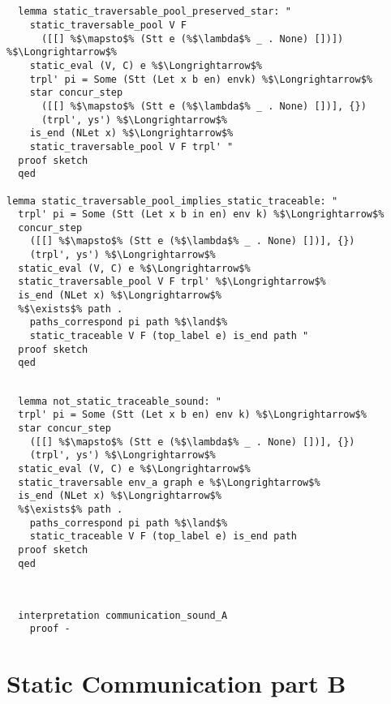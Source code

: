 \begin{lstlisting}[style=codestyle1, escapechar=\%]


  lemma static_traversable_pool_preserved_star: "
    static_traversable_pool V F
      ([[] %$\mapsto$% (Stt e (%$\lambda$% _ . None) [])]) %$\Longrightarrow$%
    static_eval (V, C) e %$\Longrightarrow$%
    trpl' pi = Some (Stt (Let x b en) envk) %$\Longrightarrow$%
    star concur_step
      ([[] %$\mapsto$% (Stt e (%$\lambda$% _ . None) [])], {})
      (trpl', ys') %$\Longrightarrow$%
    is_end (NLet x) %$\Longrightarrow$%
    static_traversable_pool V F trpl' "
  proof sketch
  qed

lemma static_traversable_pool_implies_static_traceable: "
  trpl' pi = Some (Stt (Let x b in en) env k) %$\Longrightarrow$%
  concur_step
    ([[] %$\mapsto$% (Stt e (%$\lambda$% _ . None) [])], {})
    (trpl', ys') %$\Longrightarrow$% 
  static_eval (V, C) e %$\Longrightarrow$%
  static_traversable_pool V F trpl' %$\Longrightarrow$%
  is_end (NLet x) %$\Longrightarrow$%
  %$\exists$% path . 
    paths_correspond pi path %$\land$%
    static_traceable V F (top_label e) is_end path "
  proof sketch
  qed
  \end{lstlisting}


\begin{lstlisting}[style=codestyle1, escapechar=\%]

  lemma not_static_traceable_sound: "
  trpl' pi = Some (Stt (Let x b en) env k) %$\Longrightarrow$%
  star concur_step
    ([[] %$\mapsto$% (Stt e (%$\lambda$% _ . None) [])], {})
    (trpl', ys') %$\Longrightarrow$% 
  static_eval (V, C) e %$\Longrightarrow$%
  static_traversable env_a graph e %$\Longrightarrow$%
  is_end (NLet x) %$\Longrightarrow$%
  %$\exists$% path . 
    paths_correspond pi path %$\land$%
    static_traceable V F (top_label e) is_end path
  proof sketch
  qed
  \end{lstlisting}


\begin{lstlisting}[style=codestyle1, escapechar=\%]


  interpretation communication_sound_A
    proof -

  \end{lstlisting}



\section{Static Communication part B}


